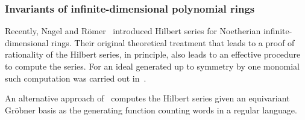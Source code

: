 \subsubsection{Invariants of infinite-dimensional polynomial rings}
Recently, Nagel and R\"omer~\cite{Nagel} introduced Hilbert series for Noetherian infinite-dimensional rings. Their original theoretical treatment that leads to a proof of rationality of the Hilbert series, in principle, also leads to an effective procedure to compute the series. For an ideal generated up to symmetry by one monomial such computation was carried out in~\cite{gunturkun2016equivariant}.

An alternative approach of~\cite{krone2016hilbert} computes the Hilbert series given an equivariant Gr\"obner basis as the generating function counting words in a regular language.
